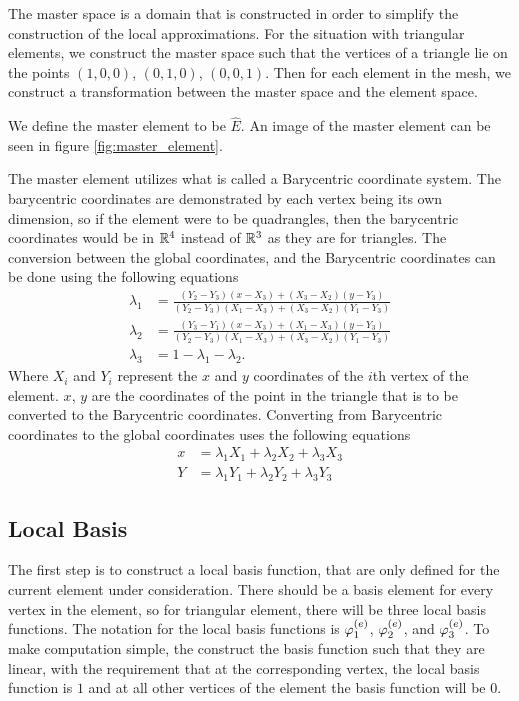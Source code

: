 \documentclass[../fem.tex]{subfile}
\begin{document}
The master space is a domain that is constructed in order to simplify the
construction of the local approximations. For the situation with triangular
elements, we construct the master space such that the vertices of a triangle
lie on the points $(1,0,0)$, $(0,1,0)$, $(0,0,1)$. Then for each element in the
mesh, we construct a transformation between the master space and the element
space.

We define the master element to be $\widehat{E}$. An image of the master
element can be seen in figure \ref{fig:master_element}.

The master element utilizes what is called a Barycentric coordinate system. The
barycentric coordinates are demonstrated by each vertex being its own
dimension, so if the element were to be quadrangles, then the barycentric
coordinates would be in $\mathbb{R}^4$ instead of $\mathbb{R}^3$ as they are for triangles. The
conversion between the global coordinates, and the Barycentric coordinates can
be done using the following equations
\begin{align*}
  \lambda_1&=\frac{(Y_2-Y_3)(x-X_3)+(X_3-X_2)(y-Y_3)}{(Y_2-Y_3)(X_1-X_3)+(X_3-X_2)(Y_1-Y_3)}\\
  \lambda_2&=\frac{(Y_3-Y_1)(x-X_3)+(X_1-X_3)(y-Y_3)}{(Y_2-Y_3)(X_1-X_3)+(X_3-X_2)(Y_1-Y_3)}\\
  \lambda_3&=1-\lambda_1-\lambda_2.
\end{align*}
Where $X_i$ and $Y_i$ represent the $x$ and $y$ coordinates of the $i$th vertex
of the element. $x$, $y$ are the coordinates of the point in the triangle that
is to be converted to the Barycentric coordinates. Converting from Barycentric
coordinates to the global coordinates uses the following equations
\begin{align*}
  x&=\lambda_1X_1+\lambda_2X_2+\lambda_3X_3\\
  Y&=\lambda_1Y_1+\lambda_2Y_2+\lambda_3Y_3
\end{align*}

\subsection{Local Basis}%
\label{sub:local_basis}

The first step is to construct a local basis function, that are only defined
for the current element under consideration. There should be a basis element
for every vertex in the element, so for triangular element, there will be three
local basis functions. The notation for the local basis functions is
$\varphi^{(e)}_1$, $\varphi^{(e)}_2$, and $\varphi^{(e)}_3$. To make computation simple, the
construct the basis function such that they are linear, with the requirement
that at the corresponding vertex, the local basis function is $1$ and at all
other vertices of the element the basis function will be $0$.
\end{document}
